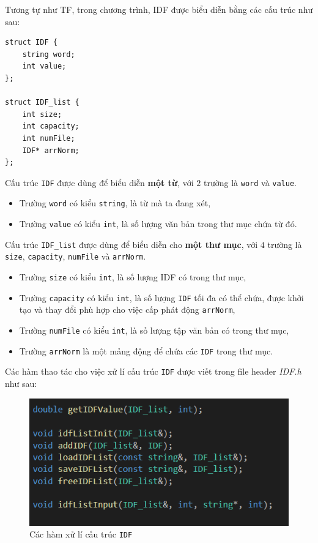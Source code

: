 \documentclass[12pt,a4paper]{article}
\begin{document}
Tương tự như TF, trong chương trình, IDF được biểu diễn bằng các cấu trúc như sau:
\begin{lstlisting}
struct IDF {
	string word;
	int value;
};

struct IDF_list {
	int size;
	int capacity;
	int numFile;
	IDF* arrNorm;
};
\end{lstlisting}
Cấu trúc \lstinline{IDF} được dùng để biểu diễn \textbf{một từ}, với \(2\) trường là \lstinline{word} và \lstinline{value}.
\begin{itemize}
\item Trường \lstinline{word} có kiểu \lstinline{string}, là từ mà ta đang xét,
\item Trường \lstinline{value} có kiểu \lstinline{int}, là số lượng văn bản trong thư mục chứa từ đó.
\end{itemize}
Cấu trúc \lstinline{IDF_list} được dùng để biểu diễn cho \textbf{một thư mục}, với \(4\) trường là \lstinline{size}, \lstinline{capacity}, \lstinline{numFile} và \lstinline{arrNorm}.
\begin{itemize}
\item Trường \lstinline{size} có kiểu \lstinline{int}, là số lượng IDF có trong thư mục,
\item Trường \lstinline{capacity} có kiểu \lstinline{int}, là số lượng \lstinline{IDF} tối đa có thể chứa, được khởi tạo và thay đổi phù hợp cho việc cấp phát động \lstinline{arrNorm},
\item Trường \lstinline{numFile} có kiểu \lstinline{int}, là số lượng tập văn bản có trong thư mục,
\item Trường \lstinline{arrNorm} là một mảng động để chứa các \lstinline{IDF} trong thư mục.
\end{itemize}
Các hàm thao tác cho việc xử lí cấu trúc  \lstinline{IDF} được viết trong file header \textit{IDF.h} như sau:
\begin{figure}[H]
\begin{center}
\includegraphics[scale=1]{Fig6}
\end{center}
\caption{Các hàm xử lí cấu trúc \lstinline{IDF}}
\label{idffunc}
\end{figure}
\end{document}
